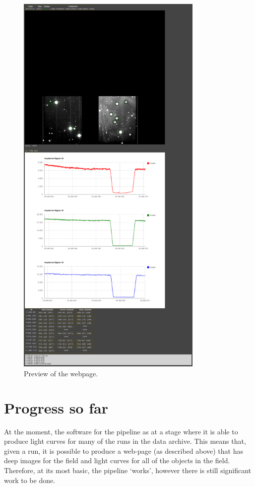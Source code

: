 \begin{figure}[!h]
	\centering
	\includegraphics[width=90mm]{images/browser.png}
	\caption{Preview of the webpage.}
	\label{browser}
\end{figure}

\section{Progress so far}
At the moment, the software for the pipeline as at a stage where it is able to produce light curves for many of the runs in the data archive. This means that, given a run, it is possible to produce a web-page (as described above) that has deep images for the field and light curves for all of the objects in the field. Therefore, at its most basic, the pipeline `works', however there is still significant work to be done. 

